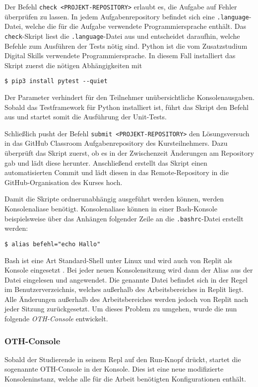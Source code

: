 Der Befehl \texttt{check <PROJEKT-REPOSITORY>} erlaubt es, die Aufgabe auf
Fehler überprüfen zu lassen. In jedem Aufgabenrepository befindet sich eine
\texttt{.language}-Datei, welche die für die Aufgabe verwendete
Programmiersprache enthält. Das \texttt{check}-Skript liest die
\texttt{.language}-Datei aus und entscheidet daraufhin, welche Befehle zum
Ausführen der Tests nötig sind. Python ist die vom Zusatzstudium Digital Skills
verwendete Programmiersprache. In diesem Fall installiert das Skript zuerst die
nötigen Abhängigkeiten mit

\begin{lstlisting}[style=Bash]
$ pip3 install pytest --quiet
\end{lstlisting}

Der Parameter  verhindert für den Teilnehmer unübersichtliche
Konsolenausgaben. Sobald das Testframework für Python installiert ist, führt das
Skript den Befehl  aus und startet somit die Ausführung der
Unit-Tests.

Schließlich pusht der Befehl \texttt{submit <PROJEKT-REPOSITORY>}
den Lösungsversuch in das GitHub Classroom Aufgabenrepository des
Kursteilnehmers. Dazu überprüft das Skript zuerst, ob es in der Zwischenzeit
Änderungen am Repository gab und lädt diese herunter. Anschließend erstellt
das Skript einen automatisierten Commit und lädt diesen in das Remote-Repository
in die GitHub-Organisation des Kurses hoch.

Damit die Skripte ordnerunabhängig ausgeführt werden können, werden
Konsolenaliase benötigt. Konsolenaliase können in einer Bash-Konsole
beispielsweise über das Anhängen folgender Zeile an die \texttt{.bashrc}-Datei
erstellt werden:

\begin{lstlisting}[style=Bash]
$ alias befehl="echo Hallo"
\end{lstlisting}

Bash ist eine Art \glqq Standard-Shell\grqq{} unter Linux und wird auch von
Replit als Konsole eingesetzt \parencite{bash}. Bei jeder neuen Konsolensitzung
wird dann der Alias aus der Datei eingelesen und angewendet. Die genannte Datei
befindet sich in der Regel im Benutzerverzeichnis, welches außerhalb des
Arbeitsbereiches in Replit liegt. Alle Änderungen außerhalb des Arbeitsbereiches
werden jedoch von Replit nach jeder Sitzung zurückgesetzt. Um dieses Problem zu
umgehen, wurde die nun folgende \emph{OTH-Console} entwickelt.

\subsubsection{OTH-Console}\label{replit-template-oth-console}
Sobald der Studierende in seinem Repl auf den Run-Knopf drückt, startet die
sogenannte OTH-Console in der Konsole. Dies ist eine neue
modifizierte Konsoleninstanz, welche alle für die Arbeit benötigten
Konfigurationen enthält.

